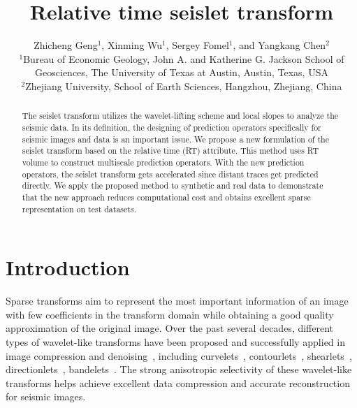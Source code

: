 
\title{Relative time seislet transform}

\author{%
    Zhicheng Geng$^1$, 
    Xinming Wu$^1$,  
    Sergey Fomel$^1$, and
    Yangkang Chen$^2$
\\
$^1$Bureau of Economic Geology, John A. and Katherine G. Jackson School of Geosciences, The University of Texas at Austin, Austin, Texas, USA \\
$^2$Zhejiang University, School of Earth Sciences, Hangzhou, Zhejiang, China}

\maketitle


\begin{abstract}
    The seislet transform utilizes the wavelet-lifting scheme and local slopes 
    to analyze the seismic data. 
    In its definition, the designing of prediction operators specifically for 
    seismic images and data is an important issue. 
    We propose a new formulation of the seislet transform based on the relative 
    time (RT) attribute. 
    This method uses RT volume to construct multiscale prediction operators. 
    With the new prediction operators, the seislet transform gets accelerated 
    since distant traces get predicted directly. 
    We apply the proposed method to synthetic and real data to demonstrate that 
    the new approach reduces computational cost and obtains excellent sparse
    representation on test datasets. 
\end{abstract}

\section{Introduction}
    Sparse transforms aim to represent the most important information of an 
    image with few coefficients in the transform domain while obtaining a good 
    quality approximation of the original image. 
    Over the past several decades, different types of wavelet-like transforms 
    have been proposed and successfully applied in image compression and 
    denoising~\cite[]{hennenfent2006seismic, li2013contourlet}, including 
    curvelets~\cite[]{starck2002curvelet, ma2010curvelet}, 
    contourlets~\cite[]{do2005contourlet}, shearlets~\cite[]{labate2005sparse}, 
    directionlets~\cite[]{velisavljevic2006directionlets}, 
    bandelets~\cite[]{le2005sparse}. 
    The strong anisotropic selectivity of these wavelet-like transforms helps 
    achieve excellent data compression and accurate reconstruction for seismic 
    images.

